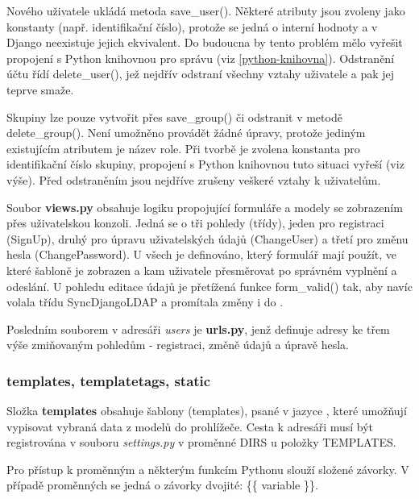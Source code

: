 Nového uživatele ukládá metoda \textsf{save\_user()}. Některé atributy
jsou zvoleny jako konstanty (např. identifikační číslo), protože se
jedná o interní hodnoty  a v Django neexistuje jejich
ekvivalent. Do budoucna by tento problém mělo vyřešit propojení s
Python knihovnou pro správu (viz \ref{python-knihovna}). Odstranění
účtu řídí \textsf{delete\_user()}, jež nejdřív odstraní všechny vztahy
uživatele a pak jej teprve smaže.

Skupiny lze pouze vytvořit přes \textsf{save\_group()} či odstranit v
metodě \textsf{delete\_group()}. Není umožněno provádět žádné úpravy,
protože jediným existujícím atributem je název role. Při tvorbě je
zvolena konstanta pro identifikační číslo skupiny, propojení s Python
knihovnou tuto situaci vyřeší (viz výše). Před odstraněním jsou
nejdříve zrušeny veškeré vztahy k uživatelům.
 
Soubor \textbf{views.py} obsahuje logiku propojující formuláře a
modely se zobrazením přes uživatelskou konzoli. Jedná se o tři pohledy
(třídy), jeden pro registraci (\textsf{SignUp}), druhý pro úpravu
uživatelských údajů (\textsf{ChangeUser}) a třetí pro změnu hesla
(\textsf{ChangePassword}). U všech je definováno, který formulář mají
použít, ve které šabloně je zobrazen a kam uživatele přesměrovat po
správném vyplnění a odeslání. U pohledu editace údajů je přetížená
funkce \textsf{form\_valid()} tak, aby navíc volala třídu
\textsf{SyncDjangoLDAP} a promítala změny i do .

Posledním souborem v adresáři \textit{users} je \textbf{urls.py}, jenž
definuje  adresy ke třem výše zmiňovaným pohledům -
registraci, změně údajů a úpravě hesla.

\subsubsection{templates, templatetags, static}
Složka \textbf{templates} obsahuje šablony (templates), psané v jazyce
, které umožňují vypisovat vybraná data z modelů do
prohlížeče. Cesta k adresáři musí být registrována v souboru
\textit{settings.py} v proměnné \textsf{DIRS} u položky
\textsf{TEMPLATES}.

Pro přístup k proměnným a některým funkcím Pythonu slouží složené
závorky. V případě proměnných se jedná o závorky dvojité: \textsf{\{\{
  variable \}\}}.

